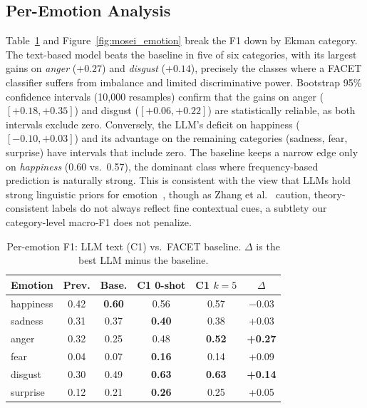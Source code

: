 \documentclass[conference]{IEEEtran}
\begin{document}
\subsection{Per-Emotion Analysis}
Table~\ref{tab:mosei_emotion} and Figure~\ref{fig:mosei_emotion} break the F1 down by Ekman category. The text-based model beats the baseline in five of six categories, with its largest gains on \emph{anger} ($+0.27$) and \emph{disgust} ($+0.14$), precisely the classes where a FACET classifier suffers from imbalance and limited discriminative power. Bootstrap 95\% confidence intervals (10{,}000 resamples) confirm that the gains on anger ($[+0.18, +0.35]$) and disgust ($[+0.06, +0.22]$) are statistically reliable, as both intervals exclude zero. Conversely, the LLM's deficit on happiness ($[-0.10, +0.03]$) and its advantage on the remaining categories (sadness, fear, surprise) have intervals that include zero. The baseline keeps a narrow edge only on \emph{happiness} (0.60 vs.\ 0.57), the dominant class where frequency-based prediction is naturally strong. This is consistent with the view that LLMs hold strong linguistic priors for emotion~\cite{Survey2024AffectiveLLM}, though as Zhang et al.~\cite{Zhang2025FluentUnfeeling} caution, theory-consistent labels do not always reflect fine contextual cues, a subtlety our category-level macro-F1 does not penalize.

\begin{table}[htbp]
\caption{Per-emotion F1: LLM text (C1) vs.\ FACET baseline. $\Delta$ is the best LLM minus the baseline.}
\label{tab:mosei_emotion}
\centering
\setlength{\tabcolsep}{4pt}
\renewcommand{\arraystretch}{1.15}
\small
\begin{tabular}{l c c c c c}
\hline
\textbf{Emotion} & \textbf{Prev.} & \textbf{Base.} & \textbf{C1 0-shot} & \textbf{C1 $k{=}5$} & \boldmath$\Delta$ \\
\hline
happiness & 0.42 & \textbf{0.60} & 0.56 & 0.57 & $-0.03$ \\
sadness & 0.31 & 0.37 & \textbf{0.40} & 0.38 & +0.03 \\
anger & 0.32 & 0.25 & 0.48 & \textbf{0.52} & \textbf{+0.27} \\
fear & 0.04 & 0.07 & \textbf{0.16} & 0.14 & +0.09 \\
disgust & 0.30 & 0.49 & \textbf{0.63} & \textbf{0.63} & \textbf{+0.14} \\
surprise & 0.12 & 0.21 & \textbf{0.26} & 0.25 & +0.05 \\
\hline
\end{tabular}
\end{table}
\end{document}
